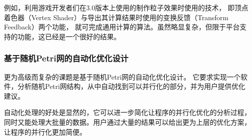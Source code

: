 例如，利用游戏开发者们在3.0版本上使用的制作粒子效果时使用的技术，
即顶点着色器（Vertex Shader）与导出其计算结果时使用的变换反馈（Transform Feedback）两个功能，
就可完成通用计算的算法。虽然略显复杂，但限于平台支持的功能，这已经是一个很好的结果。

\subsubsection{基于随机Petri网的自动化优化设计}
更为高级而复杂的课题是基于随机Petri网的自动化优化设计。
它要求实现一个软件，分析随机Petri网结构，从中自动找到可以并行化的部分，并为用户提供优化建议。

自动化处理的好处是显然的，它可以进一步简化让程序的并行化优化的分析过程，
同时又能处理大批量的数据。用户通过大量的结果可以给出更为上层的优化方案，让程序的并行化更加简便。
